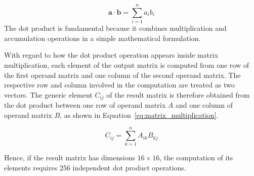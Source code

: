 \begin{equation}
\mathbf{a} \cdot \mathbf{b} = \sum_{i=1}^{n} a_i b_i
\label{eq:dot_product}
\end{equation}
The dot product is fundamental because it combines multiplication and accumulation operations in a simple mathematical formulation.

With regard to how the dot product operation appears inside matrix
multiplication, each element of the output matrix is computed from one
row of the first operand matrix and one column of the second operand
matrix. The respective row and column involved in the computation are
treated as two vectors. The generic element $C_{ij}$ of the result
matrix is therefore obtained from the dot product between one row of
operand matrix $A$ and one column of operand matrix $B$, as shown in
Equation~\eqref{eq:matrix_multiplication}.

\begin{equation}
C_{ij} = \sum_{k=1}^{n} A_{ik} B_{kj}
\label{eq:matrix_multiplication}
\end{equation}

Hence, if the result matrix has dimensions $16 \times 16$, the
computation of its elements requires 256 independent dot product
operations.



